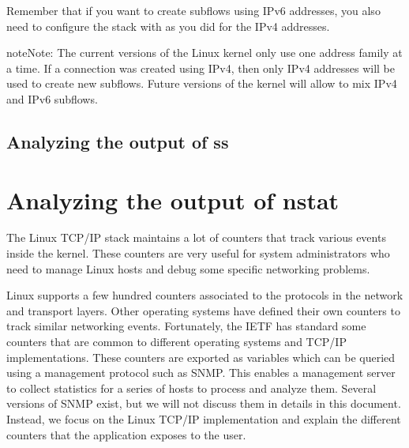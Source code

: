 \documentclass[letterpaper,10pt,english]{sphinxmanual}
\begin{document}
\sphinxAtStartPar
Remember that if you want to create subflows using IPv6 addresses, you also need to configure the stack with  as you did for the IPv4 addresses.

\begin{sphinxadmonition}{note}{Note:}
\sphinxAtStartPar
The current versions of the Linux kernel only use one address family at a time. If a connection was created using IPv4, then only IPv4 addresses will be used to create new subflows. Future versions of the kernel will allow to mix IPv4 and IPv6 subflows.
\end{sphinxadmonition}


\section{Analyzing the output of ss}
\label{\detokenize{mptcp-linux:analyzing-the-output-of-ss}}

\chapter{Analyzing the output of nstat}
\label{\detokenize{nstat-intro:analyzing-the-output-of-nstat}}\label{\detokenize{nstat-intro::doc}}
\sphinxAtStartPar
The Linux TCP/IP stack maintains a lot of counters that track various
events inside the kernel. These counters are very useful for system
administrators who need to manage Linux hosts and debug some specific
networking problems.

\sphinxAtStartPar
Linux supports a few hundred counters associated to the protocols in the
network and transport layers. Other operating systems have defined their
own counters to track similar networking events. Fortunately, the IETF
has standard some counters that are common to different operating
systems and TCP/IP implementations. These counters are exported as
variables which can be queried using a management protocol such as SNMP.
This enables a management server to collect statistics for a series of
hosts to process and analyze them.  Several versions of SNMP exist, but
we will not discuss them in details in this document. Instead, we
focus on the Linux TCP/IP implementation and explain the different counters
that the 
application exposes to the user.
\end{document}
